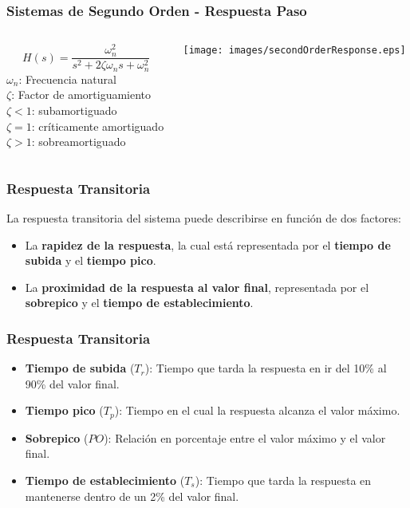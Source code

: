 \documentclass[aspectratio=169,handout]{beamer}
\theoremstyle{definition}
\theoremstyle{plain}
\theoremstyle{remark}
\begin{document}
\begin{frame}\frametitle{Sistemas de Segundo Orden - Respuesta Paso}
\vspace*{3mm}
\begin{columns}
 \begin{column}{0.3\textwidth}
  \begin{equation*}
    H(s) = \frac{\omega_n^2}{s^2 + 2 \zeta \omega_n s + \omega_n^2}
  \end{equation*}
  $\omega_n$: Frecuencia natural\\
  $\zeta$: Factor de amortiguamiento\\
  \vspace*{5mm}
  $\zeta < 1$: subamortiguado\\
  $\zeta = 1$: críticamente amortiguado\\
  $\zeta > 1$: sobreamortiguado

 \end{column} 
 \begin{column}{0.7\textwidth}
  \centering
  \texttt{[image: images/secondOrderResponse.eps]}
 \end{column} 
\end{columns}
\end{frame}

\begin{frame}[<+->]\frametitle{Respuesta Transitoria}
  La respuesta transitoria del sistema puede describirse en función de dos factores:
  \begin{itemize}
    \item La \textbf{rapidez de la respuesta}, la cual está representada por el \textbf{tiempo de subida} y el \textbf{tiempo pico}.
    \item La \textbf{proximidad de la respuesta al valor final}, representada por el \textbf{sobrepico} y el \textbf{tiempo de establecimiento}.
  \end{itemize}
\end{frame}

\begin{frame}[<+->]\frametitle{Respuesta Transitoria}
  \begin{itemize}
    \item \textbf{Tiempo de subida} ($T_r$): Tiempo que tarda la respuesta en ir del 10\% al 90\% del valor final.
    \item \textbf{Tiempo pico} ($T_p$): Tiempo en el cual la respuesta alcanza el valor máximo.
    \item \textbf{Sobrepico} ($PO$): Relación en porcentaje entre el valor máximo y el valor final.
    \item \textbf{Tiempo de establecimiento} ($T_s$): Tiempo que tarda la respuesta en mantenerse dentro de un 2\% del valor final.
  \end{itemize}
\end{frame}
\end{document}
